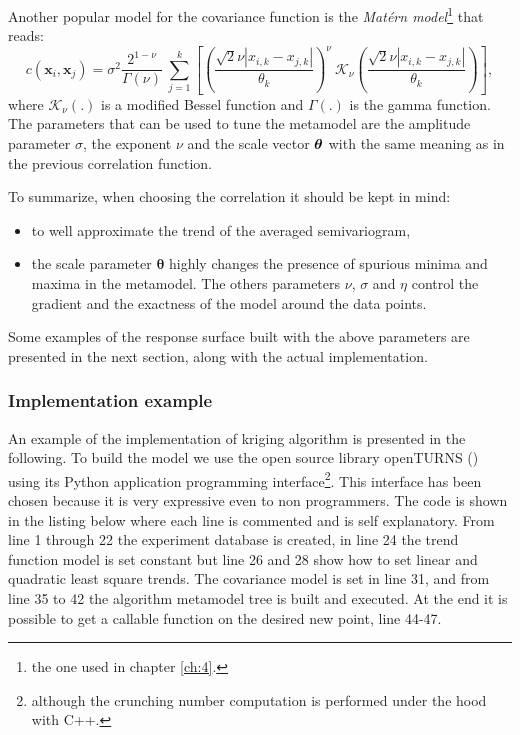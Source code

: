 Another popular model for the covariance function is the \textit{Mat\'ern model}\footnote{the one used in chapter \ref{ch:4}.} that reads:
\begin{equation}
c(\mathbf{x}_{i} , \mathbf{x}_{j}) = \sigma^2 \dfrac{2^{1- \nu}}{\Gamma(\nu)} \ \sum_{j=1}^{k} \left[ \left( \dfrac{\sqrt{2} \nu |{x}_{i,k} - {x}_{j,k} |}{\theta_k} \right)^{\nu} \ \mathcal{K}_{\nu}\left( \dfrac{\sqrt{2} \nu |{x}_{i,k} - {x}_{j,k} |}{\theta_k} \right) \right],
\label{eq:matern2}
\end{equation}
where $\mathcal{K}_{\nu}(.)$ is a modified Bessel function and $\Gamma(.)$ is the gamma function.
The parameters that can be used to tune the metamodel are the amplitude parameter $\sigma$, the exponent $\nu$ and the scale vector $\boldsymbol{\theta}$ with the same meaning as in the previous correlation function.

To summarize, when choosing the correlation it should be kept in mind:
\begin{itemize}
	\item to well approximate the trend of the averaged semivariogram,
	\item the scale parameter $\boldsymbol{\theta}$ highly changes the presence of spurious minima and maxima in the metamodel. The others parameters $\nu$, $\sigma$ and $\eta$ control the gradient and the exactness of the model around the data points.
\end{itemize}

Some examples of the response surface built with the above parameters are presented in the next section, along with the actual implementation.

\subsubsection{Implementation example}
An example of the implementation of kriging algorithm is presented in the following. To build the model we use the open source library openTURNS (\citet{openturns}) using its Python application programming interface\footnote{although the crunching number computation is performed under the hood with C++.}. This interface has been chosen because it is very expressive even to non programmers. 
The code is shown in the listing below where each line is commented and is self explanatory. From line 1 through 22 the experiment database is created, in line 24 the trend function model is set constant but line 26 and 28 show how to set linear and quadratic least square trends. The covariance model is set in line 31, and from line 35 to 42 the algorithm metamodel tree is built and executed. At the end it is possible to get a callable function on the desired new point, line 44-47.

